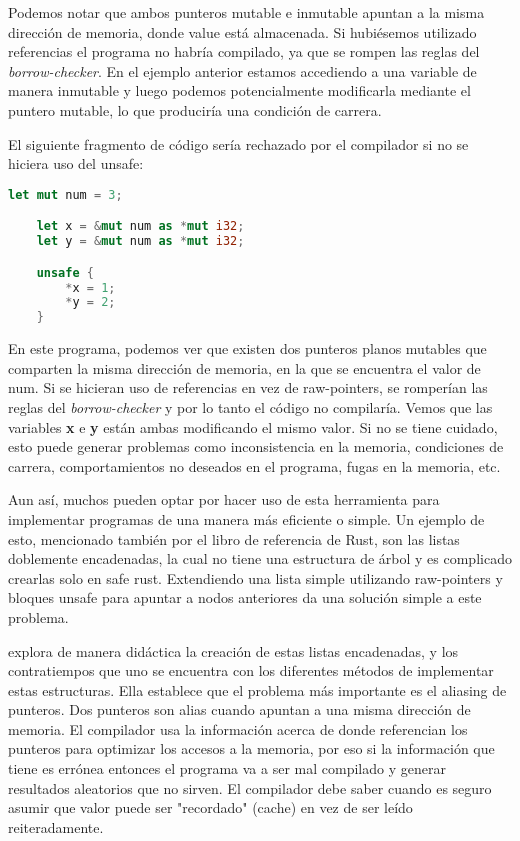 Podemos notar que ambos punteros mutable e inmutable apuntan a la misma dirección de memoria, donde value está almacenada. Si hubiésemos utilizado referencias el programa no habría compilado, ya que se rompen las reglas del \textit{borrow-checker}. En el ejemplo anterior estamos accediendo a una variable de manera inmutable y luego podemos potencialmente modificarla mediante el puntero mutable, lo que produciría una condición de carrera.

El siguiente fragmento de código sería rechazado por el compilador si no se hiciera uso del unsafe:
\begin{lstlisting}[language=Rust]
    let mut num = 3;

    let x = &mut num as *mut i32;
    let y = &mut num as *mut i32;

    unsafe {
        *x = 1;
        *y = 2;
    }
\end{lstlisting}

En este programa, podemos ver que existen dos punteros planos mutables que comparten la misma dirección de memoria, en la que se encuentra el valor de num. Si se hicieran uso de referencias en vez de raw-pointers, se romperían las reglas del \textit{borrow-checker} y por lo tanto el código no compilaría. Vemos que las variables \textbf{x} e \textbf{y} están ambas modificando el mismo valor. Si no se tiene cuidado, esto puede generar problemas como inconsistencia en la memoria, condiciones de carrera, comportamientos no deseados en el programa, fugas en la memoria, etc.

Aun así, muchos pueden optar por hacer uso de esta herramienta para implementar programas de una manera más eficiente o simple. Un ejemplo de esto, mencionado también por el libro de referencia de Rust, son las listas doblemente encadenadas, la cual no tiene una estructura de árbol y es complicado crearlas solo en safe rust. Extendiendo una lista simple utilizando raw-pointers y bloques unsafe para apuntar a nodos anteriores da una solución simple a este problema.

 explora de manera didáctica la creación de estas listas encadenadas, y los contratiempos que uno se encuentra con los diferentes métodos de implementar estas estructuras. Ella establece que el problema más importante es el aliasing de punteros. Dos punteros son alias cuando apuntan a una misma dirección de memoria. El compilador usa la información acerca de donde referencian los punteros para optimizar los accesos a la memoria, por eso si la información que tiene es errónea entonces el programa va a ser mal compilado y generar resultados aleatorios que no sirven. El compilador debe saber cuando es seguro asumir que valor puede ser "recordado" (cache) en vez de ser leído reiteradamente.

